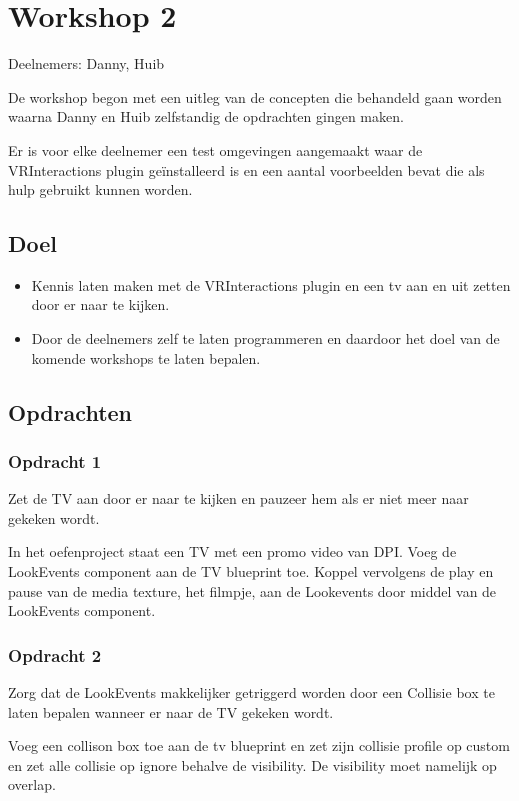 
\chapter{Workshop 2}
\label{appendix:workshop2}
\lhead{}
Deelnemers: Danny, Huib

De workshop begon met een uitleg van de concepten die behandeld gaan worden waarna Danny en Huib zelfstandig de opdrachten gingen maken.

Er is voor elke deelnemer een test omgevingen aangemaakt waar de VRInteractions plugin geïnstalleerd is en een aantal voorbeelden bevat die als hulp gebruikt kunnen worden.

\section{Doel}
\begin{itemize}
	\item Kennis laten maken met de VRInteractions plugin en een tv aan en uit zetten door er naar te kijken.
	\item Door de deelnemers zelf te laten programmeren en daardoor het doel van de komende workshops te laten bepalen. 
\end{itemize}

\section{Opdrachten}

\subsection{Opdracht 1}
Zet de TV aan door er naar te kijken en pauzeer hem als er niet meer naar gekeken wordt.

In het oefenproject staat een TV met een promo video van DPI. 
Voeg de LookEvents component aan de TV blueprint toe.
Koppel vervolgens de play en pause van de media texture, het filmpje, aan de Lookevents door middel van de LookEvents component.

\subsection{Opdracht 2}
Zorg dat de LookEvents makkelijker getriggerd worden door een Collisie box te laten bepalen wanneer er naar de TV gekeken wordt.

Voeg een collison box toe aan de tv blueprint en zet zijn collisie profile op custom en zet alle collisie op ignore behalve de visibility. De visibility moet namelijk op overlap.

